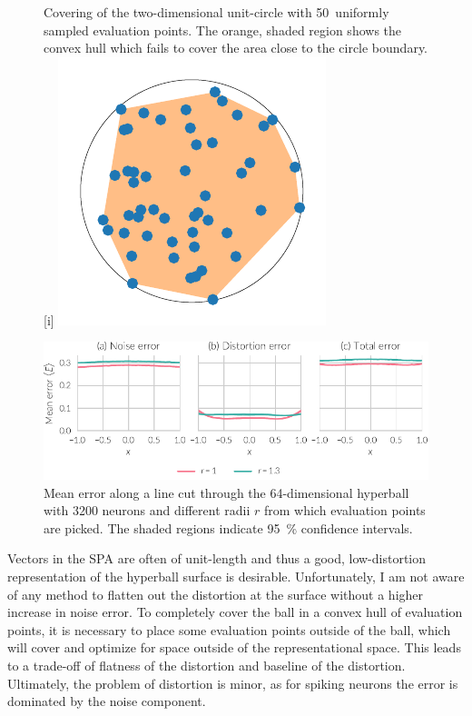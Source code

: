 \begin{figure}
    \begin{captionbeside}{Covering of the two-dimensional unit-circle with 50~uniformly sampled evaluation points. The orange, shaded region shows the convex hull which fails to cover the area close to the circle boundary.}[i]
        \includegraphics{figures/circle-covering}
    \end{captionbeside}\label{fig:circle-covering}
\end{figure}
\begin{figure}
    \centering
    \includegraphics{figures/error-radius-scale}
    \caption[Mean error along line cut through hyperball with scaled evaluation point radius]{Mean error along a line cut through the \num{64}-dimensional hyperball with \num{3200} neurons and different radii $r$ from which evaluation points are picked. The shaded regions indicate \SI{95}{\percent} confidence intervals.}\label{fig:error-radius-scale}
\end{figure}

Vectors in the SPA are often of unit-length and thus a good, low-distortion representation of the hyperball surface is desirable.
Unfortunately, I am not aware of any method to flatten out the distortion at the surface without a higher increase in noise error.
To completely cover the ball in a convex hull of evaluation points, it is necessary to place some evaluation points outside of the ball, which will cover and optimize for space outside of the representational space.
This leads to a trade-off of flatness of the distortion and baseline of the distortion.
Ultimately, the problem of distortion is minor, as for spiking neurons the error is dominated by the noise component.


